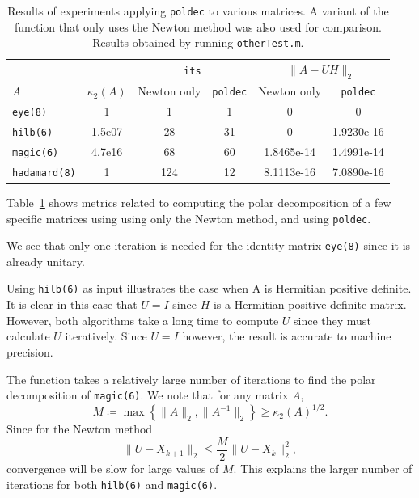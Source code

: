 \documentclass[10pt, A4paper]{article}
\begin{document}
\begin{table}[t]
	\centering
	\begin{tabular}{ l c c c c c }
		\toprule
		& & \multicolumn{2}{c}{\texttt{its}} & 
		\multicolumn{2}{c}{$\|A-UH\|_2$} \\
		\cmidrule(lr){3-4} \cmidrule(lr{12pt}){5-6}
		$A$ & $\kappa_2(A)$ & Newton only & \texttt{poldec} & Newton only 
		& 
		\texttt{poldec} \\
		\midrule
		\texttt{eye(8)} & 1 & 1 & 1 & 0 & 0 \\
		\texttt{hilb(6)} & 1.5e07 & 28 & 31 & 0 & 1.9230e-16 \\
		\texttt{magic(6)} & 4.7e16 & 68 & 60 & 1.8465e-14 & 
		1.4991e-14 \\
		\texttt{hadamard(8)} & 1 & 124 & 12 & 8.1113e-16 & 7.0890e-16\\
		\bottomrule
	\end{tabular}
	\caption{
	Results of experiments applying \texttt{poldec} 
	to	various matrices. A variant of the function that only uses the 
	Newton method was also used for comparison. Results obtained by 
	running \texttt{otherTest.m}.
	\label{tab:poldecresults}}
\end{table}

Table~\ref{tab:poldecresults} shows metrics related to computing the 
polar decomposition of a few specific matrices using using only the 
Newton method, and using \texttt{poldec}.

We see that only one iteration is needed for the identity matrix 
\texttt{eye(8)} since it is already unitary.

Using \texttt{hilb(6)} as input illustrates the case when A is 
Hermitian 
positive definite.
It is clear in this case that $U = I$ since $H$ is a Hermitian positive 
definite matrix.
However, both algorithms take a long time to compute $U$ since they 
must calculate $U$ iteratively. Since $U = I$ however, the 
result is accurate to machine precision.

The function takes a relatively large number of iterations to find the 
polar decomposition of \texttt{magic(6)}. We note that for any matrix $A$,
$$M \coloneqq \max \left\{\|A\|_2, \|A^{-1}\|_2 \right\} \geq 
\kappa_2(A)^{1/2}.$$
Since for the Newton method
$$\|U - X_{k+1}\|_2 \leq \frac{M}{2} \|U - X_k\|_2^2,$$
convergence will be slow for large values of $M$.
This explains the larger number of iterations for both \texttt{hilb(6)} 
and \texttt{magic(6)}.
\end{document}
